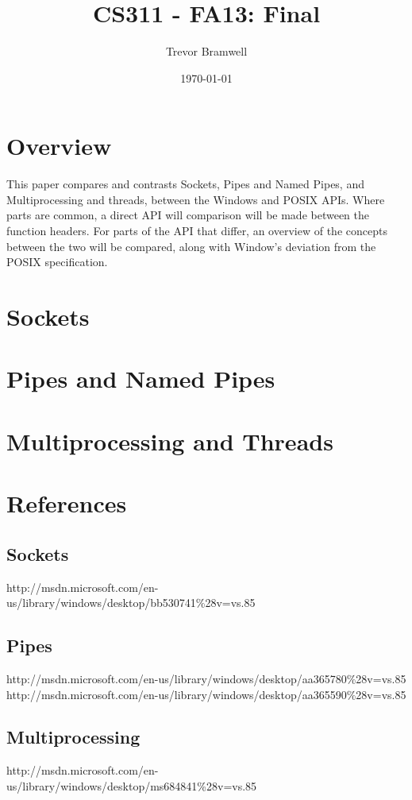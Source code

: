 \documentclass[letterpaper,10pt]{article}
\title{CS311 - FA13: Final}
\date{\today}
\author{Trevor Bramwell}
\begin{document}
\maketitle

\section{Overview}

This paper compares and contrasts Sockets, Pipes and Named Pipes, and
Multiprocessing and threads, between the Windows and POSIX APIs. Where
parts are common, a direct API will comparison will be made between the
function headers. For parts of the API that differ, an overview of the
concepts between the two will be compared, along with Window's
deviation from the POSIX specification.

\section{Sockets}

\section{Pipes and Named Pipes}

\section{Multiprocessing and Threads}

\newpage

\section{References}

\subsection{Sockets}
    http://msdn.microsoft.com/en-us/library/windows/desktop/bb530741\%28v=vs.85%

\subsection{Pipes}
    http://msdn.microsoft.com/en-us/library/windows/desktop/aa365780\%28v=vs.85%
    http://msdn.microsoft.com/en-us/library/windows/desktop/aa365590\%28v=vs.85%

\subsection{Multiprocessing}
    http://msdn.microsoft.com/en-us/library/windows/desktop/ms684841\%28v=vs.85%
\end{document}
